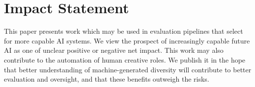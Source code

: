 \section*{Impact Statement}

This paper presents work which may be used in evaluation pipelines that select for more capable AI systems.
We view the prospect of increasingly capable future AI as one of unclear positive or negative net impact.
This work may also contribute to the automation of human creative roles.
We publish it in the hope that better understanding of machine-generated diversity will contribute to better evaluation and oversight, and that these benefits outweigh the risks.
